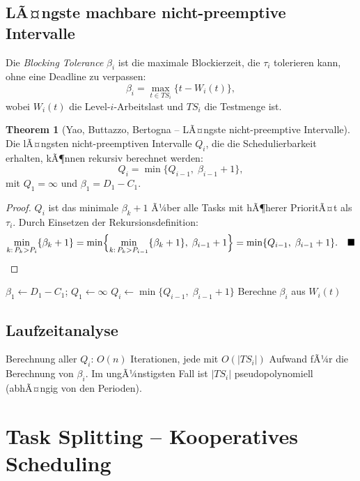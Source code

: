 ﻿\documentclass[a4paper,12pt]{report}
\theoremstyle{definition}
\newtheorem{theorem}{Theorem}[chapter]
\begin{document}
\subsection{LÃ¤ngste machbare nicht-preemptive Intervalle}

Die \emph{Blocking Tolerance} $\beta_i$ ist die maximale Blockierzeit, die $\tau_i$
tolerieren kann, ohne eine Deadline zu verpassen:
\[
	\beta_i = \max_{t \in TS_i}\{t - W_i(t)\},
\]
wobei $W_i(t)$ die Level-$i$-Arbeitslast und $TS_i$ die Testmenge ist.

\begin{theorem}[Yao, Buttazzo, Bertogna -- LÃ¤ngste nicht-preemptive Intervalle]
	Die lÃ¤ngsten nicht-preemptiven Intervalle $Q_i$, die die Schedulierbarkeit
	erhalten, kÃ¶nnen rekursiv berechnet werden:
	\[
		Q_i = \min\{Q_{i-1},\; \beta_{i-1} + 1\},
	\]
	mit $Q_1 = \infty$ und $\beta_1 = D_1 - C_1$.
\end{theorem}

\begin{proof}
	$Q_i$ ist das minimale $\beta_k + 1$ Ã¼ber alle Tasks mit hÃ¶herer PrioritÃ¤t als
	$\tau_i$. Durch Einsetzen der Rekursionsdefinition:
	\[
		\min_{k:\,P_k > P_i}\{\beta_k + 1\}
		= \min\Bigl\{\min_{k:\,P_k > P_{i-1}}\{\beta_k + 1\},\; \beta_{i-1} + 1\Bigr\}
		= \min\{Q_{i-1},\; \beta_{i-1} + 1\}. \quad\blacksquare
	\]
\end{proof}

\begin{algorithm}[H]
	\caption{Berechnung der lÃ¤ngsten nicht-preemptiven Intervalle}
	\begin{algorithmic}[1]
		\State $\beta_1 \leftarrow D_1 - C_1$; $Q_1 \leftarrow \infty$
		\State $Q_i \leftarrow \min\{Q_{i-1},\; \beta_{i-1} + 1\}$
		\State Berechne $\beta_i$ aus $W_i(t)$
		\EndFor
	\end{algorithmic}
\end{algorithm}

\subsection{Laufzeitanalyse}

Berechnung aller $Q_i$: $O(n)$ Iterationen, jede mit $O(|\mathit{TS}_i|)$ Aufwand
fÃ¼r die Berechnung von $\beta_i$. Im ungÃ¼nstigsten Fall ist $|\mathit{TS}_i|$
pseudopolynomiell (abhÃ¤ngig von den Perioden).

\section{Task Splitting -- Kooperatives Scheduling}
\end{document}
